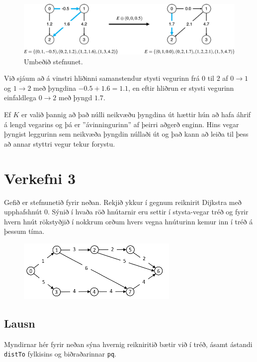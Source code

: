 \documentclass[12pt, a4paper, hidelinks]{article}
\begin{document}
\begin{figure}[H]
    \centering
    \includegraphics[width=\textwidth]{HD11/pdf/img/V2-soln.png}
    \caption{Umbeðið stefnunet.}
    \label{fig:V2-soln}
\end{figure}
\noindent
Við sjáum að á vinstri hliðinni samanstendur stysti vegurinn frá $0$ til $2$ af $0 \to 1$ og
$1 \to 2$ með þyngdina $-0.5 + 1.6 = 1.1$, en eftir hliðrun er stysti vegurinn einfaldlega $0 \to 2$ með þyngd $1.7$.

Ef $K$ er valið þannig að það núlli neikvæðu þyngdina út hættir hún að hafa áhrif á lengd vegarins og þá er ''ávinningurinn'' af þeirri aðgerð enginn. Hins vegar þyngist leggurinn sem neikvæða þyngdin núllaði út og það kann að leiða til þess að annar styttri vegur tekur forystu.

\newpage

\section*{Verkefni 3}
Gefið er stefnunetið fyrir neðan. Rekjið ykkur í gegnum reiknirit Dijkstra með upphafshnút 0. Sýnið í hvaða röð hnútarnir eru settir í stysta-vegar tréð og fyrir hvern hnút rökstyðjið í nokkrum orðum hvers vegna hnúturinn kemur inn í tréð á þessum tíma.

\begin{figure}[H]
    \centering
    \includegraphics{HD11/pdf/img/V3.png}
    \label{fig:V3}
\end{figure}

\subsection*{Lausn}
Myndirnar hér fyrir neðan sýna hvernig reikniritið bætir við í tréð, ásamt ástandi \texttt{distTo} fylkisins og biðraðarinnar \texttt{pq}.
\end{document}
